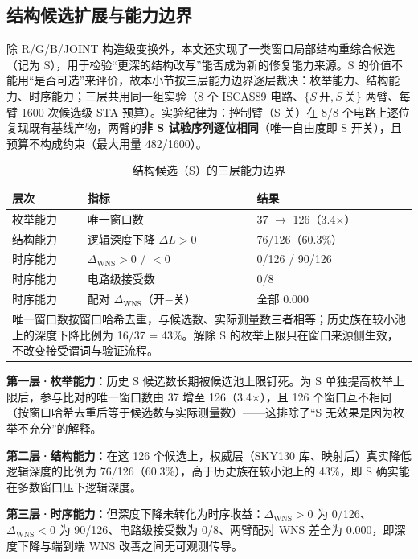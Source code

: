 \documentclass[twocolumn,10pt,fontset=windows]{ctexart}
\begin{document}
\FloatBarrier
\subsection{结构候选扩展与能力边界}\label{sec:s_boundary}
\FloatBarrier

除 R/G/B/JOINT 构造级变换外，本文还实现了一类窗口局部结构重综合候选（记为 S），用于检验“更深的结构改写”能否成为新的修复能力来源。S 的价值不能用“是否可选”来评价，故本小节按三层能力边界逐层裁决：枚举能力、结构能力、时序能力；三层共用同一组实验（8 个 ISCAS89 电路、$\{S\ \text{开}, S\ \text{关}\}$ 两臂、每臂 1600 次候选级 STA 预算）。实验纪律为：控制臂（S 关）在 8/8 个电路上逐位复现既有基线产物，两臂的\textbf{非 S 试验序列逐位相同}（唯一自由度即 S 开关），且预算不构成约束（最大用量 482/1600）。

\begin{table}[H]
\centering
\caption{结构候选（S）的三层能力边界}
\label{tab:s_boundary}
\footnotesize
\setlength{\tabcolsep}{4pt}
\begin{tabular}{lll}
\toprule
\textbf{层次} & \textbf{指标} & \textbf{结果} \\
\midrule
枚举能力 & 唯一窗口数 & 37 $\rightarrow$ 126（3.4$\times$） \\
结构能力 & 逻辑深度下降 $\Delta L>0$ & 76/126（60.3\%） \\
时序能力 & $\Delta_{\mathrm{WNS}}>0$ / $<0$ & 0/126 / 90/126 \\
时序能力 & 电路级接受数 & 0/8 \\
时序能力 & 配对 $\Delta_{\mathrm{WNS}}$（开$-$关） & 全部 0.000 \\
\bottomrule
\multicolumn{3}{p{0.92\columnwidth}}{\footnotesize 唯一窗口数按窗口哈希去重，与候选数、实际测量数三者相等；历史族在较小池上的深度下降比例为 16/37 = 43\%。解除 S 的枚举上限只在窗口来源侧生效，不改变接受谓词与验证流程。}\\
\end{tabular}
\end{table}

\textbf{第一层·枚举能力}：历史 S 候选数长期被候选池上限钉死。为 S 单独提高枚举上限后，参与比对的唯一窗口数由 37 增至 126（3.4$\times$），且 126 个窗口互不相同（按窗口哈希去重后等于候选数与实际测量数）——这排除了“S 无效果是因为枚举不充分”的解释。

\textbf{第二层·结构能力}：在这 126 个候选上，权威层（SKY130 库、映射后）真实降低逻辑深度的比例为 76/126（60.3\%），高于历史族在较小池上的 43\%，即 S 确实能在多数窗口压下逻辑深度。

\textbf{第三层·时序能力}：但深度下降未转化为时序收益：$\Delta_{\mathrm{WNS}}>0$ 为 0/126、$\Delta_{\mathrm{WNS}}<0$ 为 90/126、电路级接受数为 0/8、两臂配对 WNS 差全为 0.000，即深度下降与端到端 WNS 改善之间无可观测传导。
\end{document}
